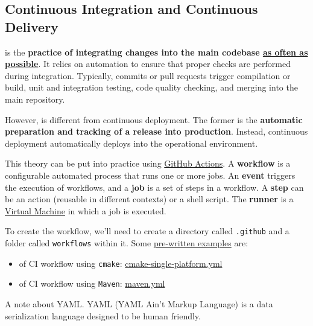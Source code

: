 \subsection{Continuous Integration and Continuous Delivery}

 is the \textbf{practice of integrating changes into the main codebase \underline{as often as possible}}. It relies on automation to ensure that proper checks are performed during integration. Typically, commits or pull requests trigger compilation or build, unit and integration testing, code quality checking, and merging into the main repository.

\highspace
However,  is different from continuous deployment. The former is the \textbf{automatic preparation and tracking of a release into production}. Instead, continuous deployment automatically deploys into the operational environment.

\highspace
This theory can be put into practice using \href{https://docs.github.com/en/actions}{GitHub Actions}. A \textbf{workflow} is a configurable automated process that runs one or more jobs. An \textbf{event} triggers the execution of workflows, and a \textbf{job} is a set of steps in a workflow. A \textbf{step} can be an action (reusable in different contexts) or a shell script. The \textbf{runner} is a \href{https://en.wikipedia.org/wiki/Virtual_machine}{Virtual Machine} in which a job is executed.

\highspace
To create the workflow, we'll need to create a directory called \texttt{.github} and a folder called \texttt{workflows} within it. Some \href{https://github.com/actions/starter-workflows/tree/main/ci}{pre-written examples} are:
\begin{itemize}
    \item {} of CI workflow using \texttt{cmake}: \href{https://github.com/actions/starter-workflows/blob/main/ci/cmake-single-platform.yml}{cmake-single-platform.yml}

    \item {} of CI workflow using \texttt{Maven}: \href{https://github.com/actions/starter-workflows/blob/main/ci/maven.yml}{maven.yml}
\end{itemize}
A note about YAML. YAML (YAML Ain't Markup Language) is a data serialization language designed to be human friendly.